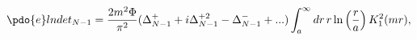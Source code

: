 \begin{equation}
\label{Eq_0408}
\pdo{e}lndet_{N-1}
  = \frac{2m^2\Phi}{\pi^2}
    (\Delta^{+}_{N-1} + i\Delta^{+ 2}_{N-1} - \Delta^{-}_{N-1} + ...)
    \int^{\infty}_a dr \, r \ln\left(\frac{r}{a}\right) K^2_1(mr), 
\end{equation}

